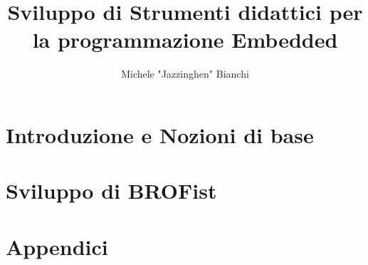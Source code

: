 \documentclass[10pt,a4paper,cleardoubleempty]{scrbook}
\author{Michele "Jazzinghen" Bianchi}
\title{Sviluppo di Strumenti didattici per la programmazione Embedded}
\begin{document}

    

    \tableofcontents
    \cleardoublepage
    
    
    
    \part{Introduzione e Nozioni di base}
    
    

    \part{Sviluppo di BROFist}
    
    
    

    \part{Appendici}
    \appendix
    
    
    

    \backmatter 
    
    
    \listoffigures
\end{document}

